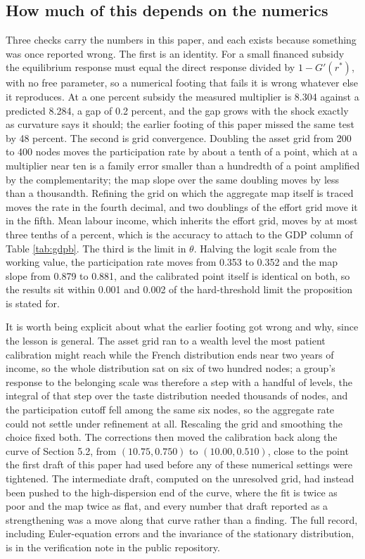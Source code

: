 \documentclass[11pt]{article}
\begin{document}
\subsection{How much of this depends on the numerics}

Three checks carry the numbers in this paper, and each exists because something was once reported wrong. The first is an identity. For a small financed subsidy the equilibrium response must equal the direct response divided by $1 - G'(r^*)$, with no free parameter, so a numerical footing that fails it is wrong whatever else it reproduces. At a one percent subsidy the measured multiplier is 8.304 against a predicted 8.284, a gap of 0.2 percent, and the gap grows with the shock exactly as curvature says it should; the earlier footing of this paper missed the same test by 48 percent. The second is grid convergence. Doubling the asset grid from 200 to 400 nodes moves the participation rate by about a tenth of a point, which at a multiplier near ten is a family error smaller than a hundredth of a point amplified by the complementarity; the map slope over the same doubling moves by less than a thousandth. Refining the grid on which the aggregate map itself is traced moves the rate in the fourth decimal, and two doublings of the effort grid move it in the fifth. Mean labour income, which inherits the effort grid, moves by at most three tenths of a percent, which is the accuracy to attach to the GDP column of Table \ref{tab:gdpb}. The third is the limit in $\theta$. Halving the logit scale from the working value, the participation rate moves from 0.353 to 0.352 and the map slope from 0.879 to 0.881, and the calibrated point itself is identical on both, so the results sit within 0.001 and 0.002 of the hard-threshold limit the proposition is stated for.

It is worth being explicit about what the earlier footing got wrong and why, since the lesson is general. The asset grid ran to a wealth level the most patient calibration might reach while the French distribution ends near two years of income, so the whole distribution sat on six of two hundred nodes; a group's response to the belonging scale was therefore a step with a handful of levels, the integral of that step over the taste distribution needed thousands of nodes, and the participation cutoff fell among the same six nodes, so the aggregate rate could not settle under refinement at all. Rescaling the grid and smoothing the choice fixed both. The corrections then moved the calibration back along the curve of Section 5.2, from $(10.75, 0.750)$ to $(10.00, 0.510)$, close to the point the first draft of this paper had used before any of these numerical settings were tightened. The intermediate draft, computed on the unresolved grid, had instead been pushed to the high-dispersion end of the curve, where the fit is twice as poor and the map twice as flat, and every number that draft reported as a strengthening was a move along that curve rather than a finding. The full record, including Euler-equation errors and the invariance of the stationary distribution, is in the verification note in the public repository.
\end{document}
